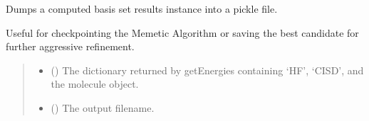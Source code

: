 \documentclass[letterpaper,10pt,english]{sphinxmanual}
\begin{document}
\begin{fulllineitems}
\label{\detokenize{api:MSTOOptpar.dumpBSI}}
\pysigstartsignatures
\pysiglinewithargsret
{}
{\sphinxparamcomma {}}
{}
\pysigstopsignatures
\sphinxAtStartPar
Dumps a computed basis set results instance into a pickle file.

\sphinxAtStartPar
Useful for checkpointing the Memetic Algorithm or saving the
best candidate for further aggressive refinement.
\begin{quote}\begin{description}
\begin{itemize}
\item {} 
\sphinxAtStartPar
{} () \textendash{} The dictionary returned by getEnergies containing
‘HF’, ‘CISD’, and the molecule object.

\item {} 
\sphinxAtStartPar
{} () \textendash{} The output filename.

\end{itemize}

\end{description}\end{quote}

\end{fulllineitems}

\end{document}
